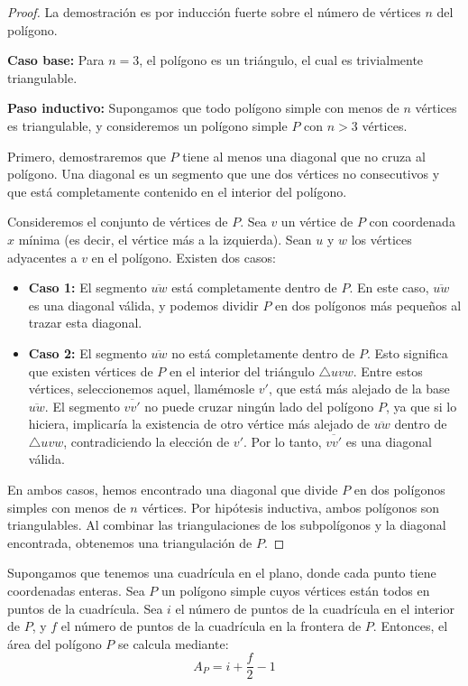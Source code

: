 \documentclass[a4paper,12pt]{article}
\begin{document}
\begin{proof}
    La demostración es por inducción fuerte sobre el número de vértices $n$ del polígono.

    \textbf{Caso base:} Para $n=3$, el polígono es un triángulo, el cual es trivialmente triangulable.

    \textbf{Paso inductivo:} Supongamos que todo polígono simple con menos de $n$ vértices es triangulable, y consideremos un polígono simple $P$ con $n > 3$ vértices.

    Primero, demostraremos que $P$ tiene al menos una diagonal que no cruza al polígono. Una diagonal es un segmento que une dos vértices no consecutivos y que está completamente contenido en el interior del polígono.

    Consideremos el conjunto de vértices de $P$. Sea $v$ un vértice de $P$ con coordenada $x$ mínima (es decir, el vértice más a la izquierda). Sean $u$ y $w$ los vértices adyacentes a $v$ en el polígono. Existen dos casos:

    \begin{itemize}
        \item \textbf{Caso 1:} El segmento $\overline{uw}$ está completamente dentro de $P$. En este caso, $\overline{uw}$ es una diagonal válida, y podemos dividir $P$ en dos polígonos más pequeños al trazar esta diagonal.
        \item \textbf{Caso 2:} El segmento $\overline{uw}$ no está completamente dentro de $P$. Esto significa que existen vértices de $P$ en el interior del triángulo $\triangle uvw$. Entre estos vértices, seleccionemos aquel, llamémosle $v'$, que está más alejado de la base $\overline{uw}$. El segmento $\overline{vv'}$ no puede cruzar ningún lado del polígono $P$, ya que si lo hiciera, implicaría la existencia de otro vértice más alejado de $\overline{uw}$ dentro de $\triangle uvw$, contradiciendo la elección de $v'$. Por lo tanto, $\overline{vv'}$ es una diagonal válida.
    \end{itemize}

    En ambos casos, hemos encontrado una diagonal que divide $P$ en dos polígonos simples con menos de $n$ vértices. Por hipótesis inductiva, ambos polígonos son triangulables. Al combinar las triangulaciones de los subpolígonos y la diagonal encontrada, obtenemos una triangulación de $P$.
\end{proof}

\begin{thm}
    Supongamos que tenemos una cuadrícula en el plano, donde cada punto tiene coordenadas enteras. Sea $P$ un polígono simple cuyos vértices están todos en puntos de la cuadrícula. Sea $i$ el número de puntos de la cuadrícula en el interior de $P$, y $f$ el número de puntos de la cuadrícula en la frontera de $P$. Entonces, el área del polígono $P$ se calcula mediante:
    $$A_P = i + \frac{f}{2} - 1$$
\end{thm}
\end{document}
